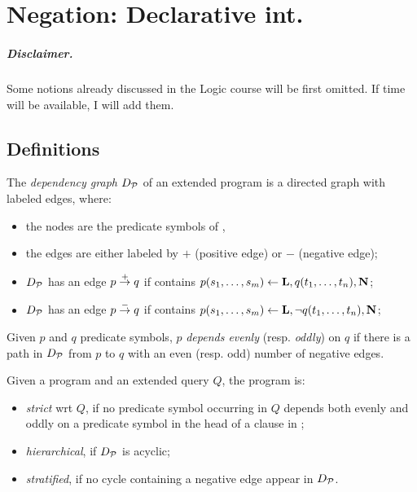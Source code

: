 \chapter{Negation: Declarative int.}

\paragraph{Disclaimer.} Some notions already discussed in the Logic course will be first omitted. If time will be available, I will add them.

\section{Definitions}


\begin{dfn}
    \label{decl-neg:dfn-1}
    The \emph{dependency graph} \(D_\mathcal{P}\) of an extended program \prog is a directed graph with labeled edges, where:
    \begin{itemize}
        \item the nodes are the predicate symbols of \prog,
        \item the edges are either labeled by \(+\) (positive edge) or \(-\) (negative edge);
        \item \(D_\mathcal{P}\) has an edge \(p \overset{+}{\to} q\) if \prog contains \(p(s_1,\dotsc,s_m) \leftarrow \mathbf{L}, q(t_1,\dotsc,t_n),\mathbf{N}\);
        \item \(D_\mathcal{P}\) has an edge \(p \overset{-}{\to} q\) if \prog contains \(p(s_1,\dotsc,s_m) \leftarrow \mathbf{L}, \neg q(t_1,\dotsc,t_n),\mathbf{N}\);
    \end{itemize}
    Given \(p\) and \(q\) predicate symbols, \(p\) \emph{depends evenly} (resp. \emph{oddly}) on \(q\) if there is a path in \(D_\mathcal{P}\) from \(p\) to \(q\) with an even (resp. odd) number of negative edges.

    Given a program \prog and an extended query \(Q\), the program is:
    \begin{itemize}
        \item \emph{strict} wrt \(Q\), if no predicate symbol occurring in \(Q\) depends both evenly and oddly on a predicate symbol in the head of a clause in \prog;
        \item \emph{hierarchical}, if \(D_\mathcal{P}\) is acyclic;
        \item \emph{stratified}, if no cycle containing a negative edge appear in \(D_\mathcal{P}\).
    \end{itemize}
\end{dfn}

